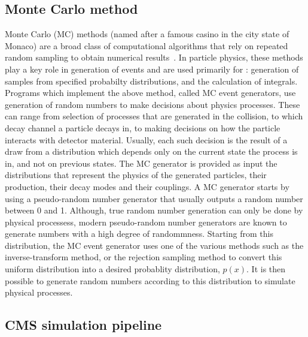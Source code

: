 \subsection{Monte Carlo method}

Monte Carlo (MC) methods (named after a famous casino in the city state of Monaco) are a broad class of computational algorithms that rely on repeated random sampling to obtain numerical results~\cite{mcwiki}. In particle physics, these methods play a key role in generation of events and are used primarily for : generation of samples from specified probabilty distributions, and the calculation of integrals. Programs which implement the above method, called MC event generators, use generation of random numbers to make decisions about physics processes. These can range from selection of processes that are generated in the collision, to which decay channel a particle decays in, to making decisions on how the particle interacts with detector material. Usually, each such decision is the result of a draw from a distribution which depends only on the current state the process is in, and not on previous states. The MC generator is provided as input the distributions that represent the physics of the generated particles, their production, their decay modes and their couplings. A MC generator starts by using a pseudo-random number generator that usually outputs a random number between 0 and 1. Although, true random number generation can only be done by physical processess, modern pseudo-random number generators are known to generate numbers with a high degree of randommness. Starting from this distribution, the MC event generator uses one of the various methods such as the inverse-transform method, or the rejection sampling method to convert this uniform distribution into a desired probablity distribution, $p(x)$. It is then possible to generate random numbers according to this distribution to simulate physical processes. 


\subsection{CMS simulation pipeline}

